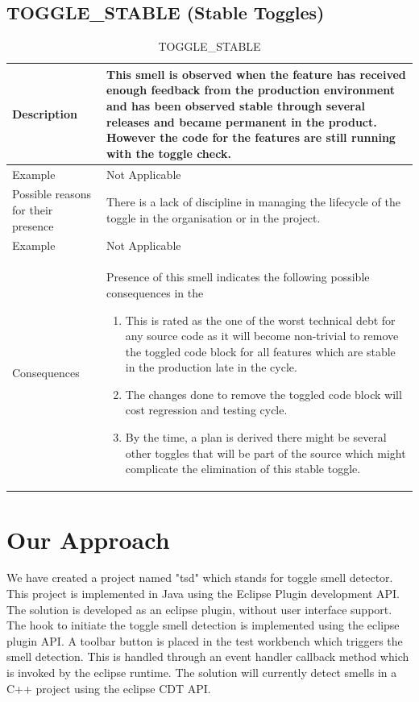 \documentclass[conference]{IEEEtran}
\begin{document}
\subsection{TOGGLE\_STABLE (Stable Toggles)}

\begin{table}[ht]
\caption{TOGGLE\_STABLE}
\centering
\begin{tabular}{|p{1.5cm}|p{6.6cm}|}
 \hline\hline
 Description & This smell is observed when the feature has received enough feedback from the production environment and has been observed stable through several releases and became permanent in the product. However the code for the features are still running with the toggle check.  \\ \hline

Example & Not Applicable \\ \hline
Possible reasons for their presence & There is a lack of discipline in managing the lifecycle of the toggle in the organisation or in the project. \\ \hline
Example & Not Applicable \\ \hline
Consequences & Presence of this smell indicates the following possible consequences in the
\begin{enumerate}
	\item This is rated as the one of the worst technical debt for any source code as it will become non-trivial to remove the toggled code block for all features which are stable in the production late in the cycle.
\item The changes done to remove the toggled code block will cost regression and testing cycle.
\item By the time, a plan is derived there might be several other toggles that will be part of the source which might complicate the elimination of this stable toggle. 
\end{enumerate}
\\ \hline

\end{tabular}
\label{table:chrome-dir-data}
\end{table}

\section{Our Approach}
\label{Methodology and Implimentation}
We have created a project named "tsd" which stands for toggle smell detector. This project is implemented in Java using the Eclipse Plugin development API. The solution is developed as an eclipse plugin, without user interface support. The hook to initiate the toggle smell detection is implemented using the eclipse plugin API. A toolbar button is placed in the test workbench which triggers the smell detection. This is handled through an event handler callback method which is invoked by the eclipse runtime. The solution will currently detect smells in a C++ project using the eclipse CDT API.\\
\end{document}
